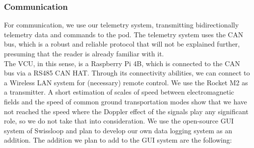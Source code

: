 \subsubsection*{Communication}
For communication, we use our telemetry system, transmitting bidirectionally telemetry data and commands to the pod. The telemetry system uses the CAN bus, which is a robust and reliable protocol that will not be explained further, presuming that the reader is already familiar with it. \\
The VCU, in this sense, is a Raspberry Pi 4B, which is connected to the CAN bus via a RS485 CAN HAT. 
Through its connectivity abilities, we can connect to a Wireless LAN system for (necessary) remote control. We use the Rocket M2 as a transmitter. A short estimation of scales of speed between electromagnetic fields and the speed of common ground transportation modes show that we have not reached the speed where the Doppler effect of the signals play any significant role, so we do not take that into consideration. We use the open-source GUI system of Swissloop and plan to develop our own data logging system as an addition. The addition we plan to add to the GUI system are the following:
